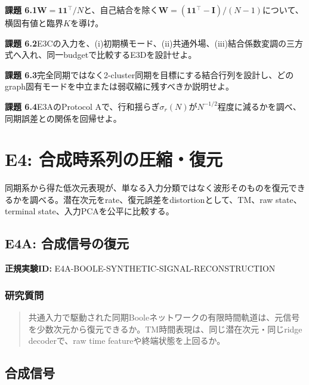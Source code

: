 \documentclass[a4paper,11pt,oneside,openany]{ltjsbook}
\newcommand{\ones}{\bm{1}}
\newcommand{\mat}[1]{\bm{#1}}
\newcommand{\EID}[1]{\textsf{#1}}
\begin{document}
\begin{taskbox}
\textbf{課題 6.1}\quad \(\mat W=\ones\ones^\top/N\)と、自己結合を除く\(\mat W=(\ones\ones^\top-\mat I)/(N-1)\)について、横固有値と臨界\(K\)を導け。

\medskip
\textbf{課題 6.2}\quad E3Cの入力を、(i)初期横モード、(ii)共通外場、(iii)結合係数変調の三方式へ入れ、同一budgetで比較するE3Dを設計せよ。

\medskip
\textbf{課題 6.3}\quad 完全同期ではなく2-cluster同期を目標にする結合行列を設計し、どのgraph固有モードを中立または弱収縮に残すべきか説明せよ。

\medskip
\textbf{課題 6.4}\quad E3AのProtocol Aで、行和揺らぎ\(\sigma_r(N)\)が\(N^{-1/2}\)程度に減るかを調べ、同期誤差との関係を回帰せよ。
\end{taskbox}

\chapter{E4: 合成時系列の圧縮・復元}
\label{chap:e4}

\begin{purposebox}
同期系から得た低次元表現が、単なる入力分類ではなく波形そのものを復元できるかを調べる。潜在次元をrate、復元誤差をdistortionとして、TM、raw state、terminal state、入力PCAを公平に比較する。
\end{purposebox}

\section{E4A: 合成信号の復元}

\noindent\textbf{正規実験ID:} \EID{E4A-BOOLE-SYNTHETIC-SIGNAL-RECONSTRUCTION}

\subsection{研究質問}

\begin{quote}
共通入力で駆動された同期Booleネットワークの有限時間軌道は、元信号を少数次元から復元できるか。TM時間表現は、同じ潜在次元・同じridge decoderで、raw time featureや終端状態を上回るか。
\end{quote}

\section{合成信号}
\end{document}
